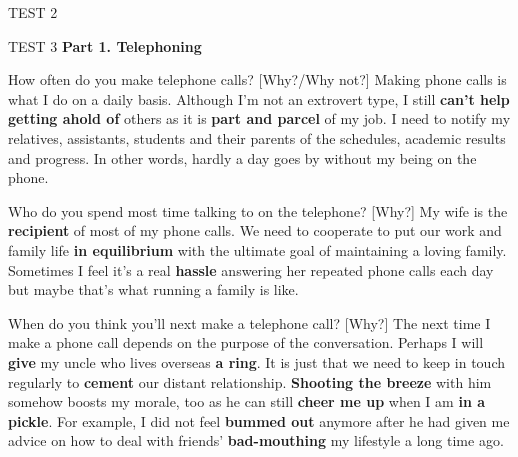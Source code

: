 \begin{glossarymc}[Cambridge 9]
\begin{test}{TEST 2}
\begin{VocabHighlights}
    \end{VocabHighlights}
    \end{test}

    \begin{test}{TEST 3}
    \noindent
    \textbf{Part 1. Telephoning}
    \begin{qa}{How often do you make telephone calls? [Why?/Why not?]}
    Making phone calls is what I do on a daily basis. Although I'm not an extrovert type, I still \textbf{can't help getting ahold of} others as it is \textbf{part and parcel} of my job. I need to notify my relatives, assistants, students and their parents of the schedules, academic results and progress. In other words, hardly a day goes by without my being on the phone.
    \end{qa}

    \begin{qa}{Who do you spend most time talking to on the telephone? [Why?]}
    My wife is the \textbf{recipient} of most of my phone calls. We need to cooperate to put our work and family life \textbf{in equilibrium} with the ultimate goal of maintaining a loving family. Sometimes I feel it's a real \textbf{hassle} answering her repeated phone calls each day but maybe that's what running a family is like.
    \end{qa}

    \begin{qa}{When do you think you'll next make a telephone call? [Why?]}
    The next time I make a phone call depends on the purpose of the conversation. Perhaps I will \textbf{give} my uncle who lives overseas \textbf{a ring}. It is just that we need to keep in touch regularly to \textbf{cement} our distant relationship. \textbf{Shooting the breeze} with him somehow boosts my morale, too as he can still \textbf{cheer me up} when I am \textbf{in a pickle}. For example, I did not feel \textbf{bummed out} anymore after he had given me advice on how to deal with friends' \textbf{bad-mouthing} my lifestyle a long time ago.
    \end{qa}


\end{test}
\end{glossarymc}
